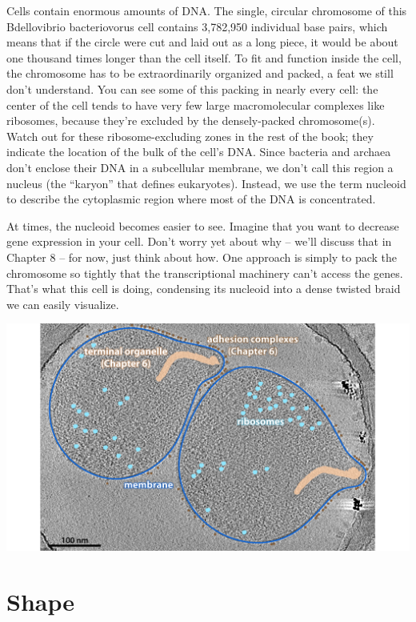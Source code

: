 \documentclass[]{tufte-book}
\begin{document}
Cells contain enormous amounts of DNA. The single, circular chromosome
of this Bdellovibrio bacteriovorus cell contains 3,782,950 individual
base pairs, which means that if the circle were cut and laid out as a
long piece, it would be about one thousand times longer than the cell
itself. To fit and function inside the cell, the chromosome has to be
extraordinarily organized and packed, a feat we still don't understand.
You can see some of this packing in nearly every cell: the center of the
cell tends to have very few large macromolecular complexes like
ribosomes, because they're excluded by the densely-packed chromosome(s).
Watch out for these ribosome-excluding zones in the rest of the book;
they indicate the location of the bulk of the cell's DNA. Since bacteria
and archaea don't enclose their DNA in a subcellular membrane, we don't
call this region a nucleus (the ``karyon'' that defines eukaryotes).
Instead, we use the term nucleoid to describe the cytoplasmic region
where most of the DNA is concentrated.

At times, the nucleoid becomes easier to see. Imagine that you want to
decrease gene expression in your cell. Don't worry yet about why --
we'll discuss that in Chapter 8 -- for now, just think about how. One
approach is simply to pack the chromosome so tightly that the
transcriptional machinery can't access the genes. That's what this cell
is doing, condensing its nucleoid into a dense twisted braid we can
easily visualize.

\includegraphics{img/02_static/2_1_Mgenitalium}

\chapter{Shape}\label{shape}


\end{document}
